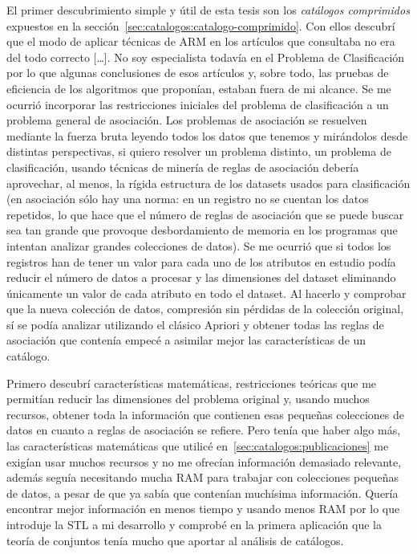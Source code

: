 El primer descubrimiento simple y útil de esta tesis son los \emph{catálogos comprimidos} expuestos en la sección~\ref{sec:catalogos:catalogo-comprimido}. Con ellos descubrí que el modo de aplicar técnicas de ARM en los artículos que consultaba no era del todo correcto  [\ldots]. No soy especialista todavía en el Problema de Clasificación por lo que algunas conclusiones de esos artículos y, sobre todo, las pruebas de eficiencia de los algoritmos que proponían, estaban fuera de mi alcance. Se me ocurrió incorporar las restricciones iniciales del problema de clasificación a un problema general de asociación. Los problemas de asociación se resuelven mediante la fuerza bruta leyendo todos los datos que tenemos y mirándolos desde distintas perspectivas, si quiero resolver un problema distinto, un problema de clasificación, usando técnicas de minería de reglas de asociación debería aprovechar, al menos, la rígida estructura de los datasets usados para clasificación (en asociación sólo hay una norma: en un registro no se cuentan los datos repetidos, lo que hace que el número de reglas de asociación que se puede buscar sea tan grande que provoque desbordamiento de memoria en los programas que intentan analizar grandes colecciones de datos). Se me ocurrió que si todos los registros han de tener un valor para cada uno de los atributos en estudio podía reducir el número de datos a procesar y las dimensiones del dataset eliminando únicamente un valor de cada atributo en todo el dataset. Al hacerlo y comprobar que la nueva colección de datos, compresión sin pérdidas de la colección original, sí se podía analizar utilizando el clásico Apriori y obtener todas las reglas de asociación que contenía empecé a asimilar mejor las características de un catálogo.

Primero descubrí características matemáticas, restricciones teóricas que me permitían reducir las dimensiones del problema original y, usando muchos recursos, obtener toda la información que contienen esas pequeñas colecciones de datos en cuanto a reglas de asociación se refiere. Pero tenía que haber algo más, las características matemáticas que utilicé en~\ref{sec:catalogos:publicaciones} me exigían usar muchos recursos y no me ofrecían información demasiado relevante, además seguía necesitando mucha RAM para trabajar con colecciones pequeñas de datos, a pesar de que ya sabía que contenían muchísima información. Quería encontrar mejor información en menos tiempo y usando menos RAM por lo que introduje la STL a mi desarrollo y comprobé en la primera aplicación que la teoría de conjuntos tenía mucho que aportar al análisis de catálogos.
